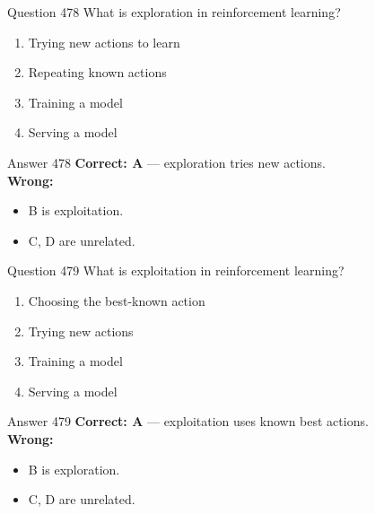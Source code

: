 \documentclass[aspectratio=169,11pt]{beamer}
\begin{document}
	\begin{frame}{Question 478}
		What is exploration in reinforcement learning?
		\begin{enumerate}[label=\Alph*.]
			\item Trying new actions to learn
			\item Repeating known actions
			\item Training a model
			\item Serving a model
		\end{enumerate}
	\end{frame}
	\begin{frame}{Answer 478}
		\textbf{Correct: A} --- exploration tries new actions.\\
		\vspace{0.5em}
		\textbf{Wrong:}
		\begin{itemize}
			\item B is exploitation.
			\item C, D are unrelated.
		\end{itemize}
	\end{frame}
	
	\begin{frame}{Question 479}
		What is exploitation in reinforcement learning?
		\begin{enumerate}[label=\Alph*.]
			\item Choosing the best-known action
			\item Trying new actions
			\item Training a model
			\item Serving a model
		\end{enumerate}
	\end{frame}
	\begin{frame}{Answer 479}
		\textbf{Correct: A} --- exploitation uses known best actions.\\
		\vspace{0.5em}
		\textbf{Wrong:}
		\begin{itemize}
			\item B is exploration.
			\item C, D are unrelated.
		\end{itemize}
	\end{frame}
	
\end{document}
